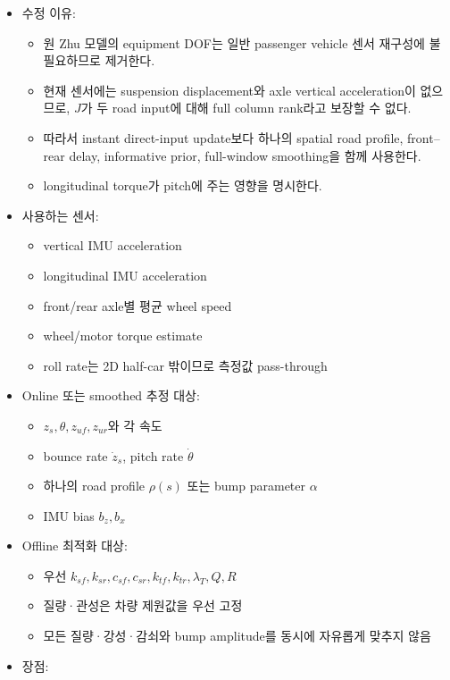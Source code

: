 \documentclass[letterpaper,10pt,journal,twocolumn]{ieeeconf}
\begin{document}
\begin{itemize}

\item
  수정 이유:

  \begin{itemize}
  
  \item
    원 Zhu 모델의 equipment DOF는 일반 passenger vehicle 센서 재구성에 불필요하므로 제거한다.
  \item
    현재 센서에는 suspension displacement와 axle vertical acceleration이 없으므로, \(J\)가 두 road input에 대해 full column rank라고 보장할 수 없다.
  \item
    따라서 instant direct-input update보다 하나의 spatial road profile, front--rear delay, informative prior, full-window smoothing을 함께 사용한다.
  \item
    longitudinal torque가 pitch에 주는 영향을 명시한다.
  \end{itemize}
\item
  사용하는 센서:

  \begin{itemize}
  
  \item
    vertical IMU acceleration
  \item
    longitudinal IMU acceleration
  \item
    front/rear axle별 평균 wheel speed
  \item
    wheel/motor torque estimate
  \item
    roll rate는 2D half-car 밖이므로 측정값 pass-through
  \end{itemize}
\item
  Online 또는 smoothed 추정 대상:

  \begin{itemize}
  
  \item
    \(z_s,\theta,z_{uf},z_{ur}\)와 각 속도
  \item
    bounce rate \(\dot z_s\), pitch rate \(\dot\theta\)
  \item
    하나의 road profile \(\rho(s)\) 또는 bump parameter \(\alpha\)
  \item
    IMU bias \(b_z,b_x\)
  \end{itemize}
\item
  Offline 최적화 대상:

  \begin{itemize}
  
  \item
    우선 \(k_{sf},k_{sr},c_{sf},c_{sr},k_{tf},k_{tr},\lambda_T,Q,R\)
  \item
    질량·관성은 차량 제원값을 우선 고정
  \item
    모든 질량·강성·감쇠와 bump amplitude를 동시에 자유롭게 맞추지 않음
  \end{itemize}
\item
  장점:


\end{itemize}
\end{document}
